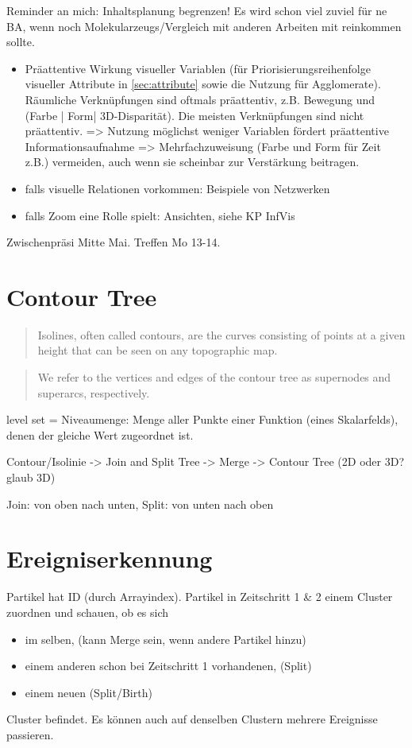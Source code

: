 Reminder an mich: Inhaltsplanung begrenzen! Es wird schon viel zuviel für ne BA, wenn noch Molekularzeugs/Vergleich mit anderen Arbeiten mit reinkommen sollte.

\begin{itemize}
\item Präattentive Wirkung visueller Variablen (für Priorisierungsreihenfolge visueller Attribute in \autoref{sec:attribute} sowie die Nutzung für Agglomerate). Räumliche Verknüpfungen sind oftmals präattentiv, z.B. Bewegung und (Farbe | Form| 3D-Disparität). Die meisten Verknüpfungen sind nicht präattentiv. => Nutzung möglichst weniger Variablen fördert präattentive Informationsaufnahme =>  Mehrfachzuweisung (Farbe und Form für Zeit z.B.) vermeiden, auch wenn sie scheinbar zur Verstärkung beitragen.
\item falls visuelle Relationen vorkommen: Beispiele von Netzwerken
\item falls Zoom eine Rolle spielt: Ansichten, siehe KP InfVis
\end{itemize}

Zwischenpräsi Mitte Mai.
Treffen Mo 13-14.

\section{Contour Tree}

\blockcquote[1]{ComputingContourTrees}{Isolines, often called contours, are the curves consisting of points at a given height that can be seen on any topographic map.}

\blockcquote[2]{ComputingContourTrees}{We refer to the vertices and edges of the contour tree as supernodes and superarcs, respectively.}

level set = Niveaumenge: Menge aller Punkte einer Funktion (eines Skalarfelds), denen der gleiche Wert zugeordnet ist.

Contour/Isolinie -> Join and Split Tree -> Merge -> Contour Tree (2D oder 3D? glaub 3D) \cite[S.~1]{ContourTreeAlgorithm}

Join: von oben nach unten, Split: von unten nach oben \cite{ContourTreeJoinSplit}

\section{Ereigniserkennung}
Partikel hat ID (durch Arrayindex). Partikel in Zeitschritt 1 \& 2 einem Cluster zuordnen und schauen, ob es sich
\begin{itemize}
	\item im selben, (kann Merge sein, wenn andere Partikel hinzu)
	\item einem anderen schon bei Zeitschritt 1 vorhandenen, (Split)
	\item einem neuen (Split/Birth)
\end{itemize}
Cluster befindet. Es können auch auf denselben Clustern mehrere Ereignisse passieren.

